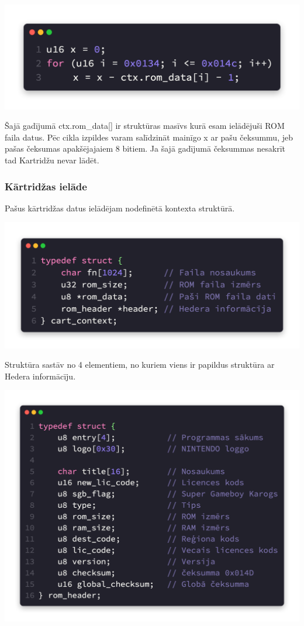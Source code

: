 \documentclass[12pt]{article}
\begin{document}
	\includegraphics[scale=0.5]{img/checksum.png}
	
	Šajā gadījumā ctx.rom\_data[] ir struktūras masīvs kurā esam ielādējuši ROM faila datus. Pēc cikla izpildes varam salīdzināt mainīgo x ar pašu čeksummu, jeb pašas čeksumas apakšējajaiem 8 bitiem. Ja šajā gadījumā čeksummas nesakrīt tad Kartridžu nevar lādēt.
	
	\pagebreak
	\subsubsection{Kārtridžas ielāde}
	
	Pašus kārtridžas datus ielādējam nodefinētā kontexta struktūrā.
	
	\includegraphics[scale=0.5]{img/structcart.png}
	
	Struktūra sastāv no 4 elementiem, no kuriem viens ir papildus struktūra ar Hedera informācīju.
	
	\includegraphics[scale=0.5]{img/rom_header.png}
	
\end{document}
